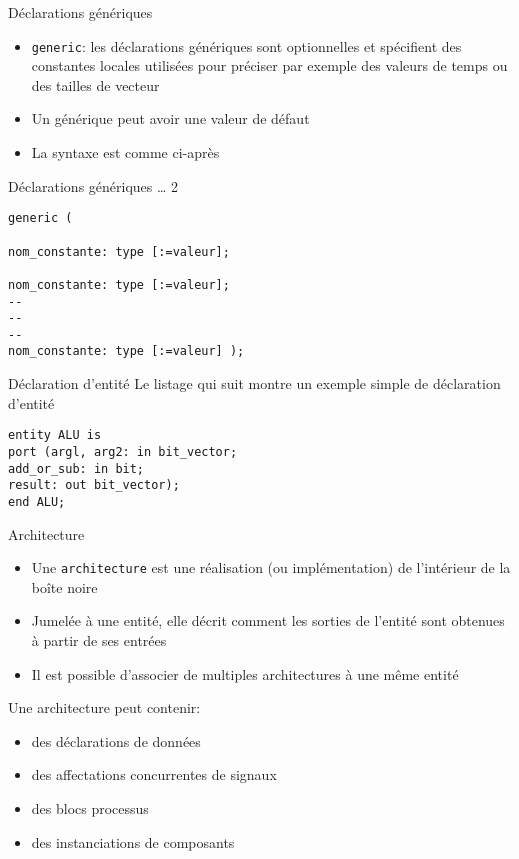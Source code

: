 \documentclass[presentation]{beamer}
\begin{document}
\begin{frame}[label={sec:orgc002b5d},fragile]{Déclarations génériques}
 \begin{itemize}
\item \alert{\texttt{generic}}: les déclarations génériques sont optionnelles et spécifient des constantes locales utilisées pour préciser par exemple des valeurs de temps ou des tailles de vecteur
\item Un générique peut avoir une valeur de défaut
\item La syntaxe est comme ci-après
\end{itemize}
\end{frame}

\begin{frame}[label={sec:org2dc3f7b},fragile]{Déclarations génériques \ldots{} 2}
 \begin{verbatim}
generic (

nom_constante: type [:=valeur];

nom_constante: type [:=valeur];
--
--
--
nom_constante: type [:=valeur] );
\end{verbatim}
\end{frame}

\begin{frame}[label={sec:orgb7fb481},fragile]{Déclaration d'entité}
 Le listage qui suit montre un exemple simple de déclaration d'entité

\begin{verbatim}
entity ALU is
port (argl, arg2: in bit_vector;
add_or_sub: in bit;
result: out bit_vector);
end ALU;
\end{verbatim}
\end{frame}

\begin{frame}[label={sec:org46c53bd},fragile]{Architecture}
 \begin{itemize}
\item Une \alert{\texttt{architecture}} est une réalisation (ou implémentation) de l'intérieur de la boîte noire
\item Jumelée à une entité, elle décrit comment les sorties de l'entité sont obtenues à partir de ses entrées
\item Il est possible d'associer de multiples architectures à une même entité
\end{itemize}

Une architecture peut contenir:

\begin{itemize}
\item des déclarations de données

\item des affectations concurrentes de signaux

\item des blocs processus

\item des instanciations de composants
\end{itemize}
\end{frame}
\end{document}
